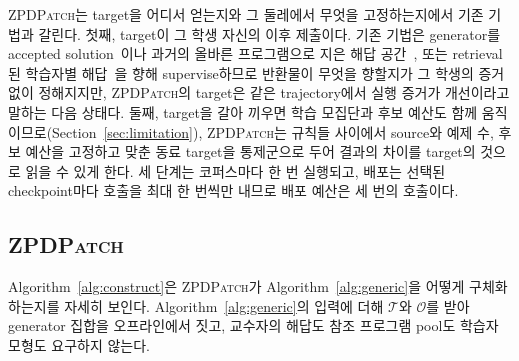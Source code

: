 \documentclass[10pt,conference]{IEEEtran}
\begin{document}
\textsc{ZPDPatch}는 target을 어디서 얻는지와 그 둘레에서 무엇을 고정하는지에서 기존 기법과 갈린다. 첫째, target이 그 학생 자신의 이후 제출이다. 기존 기법은 generator를 accepted solution~\cite{gulwani2018automated,wang2018search,hu2019re}이나 과거의 올바른 프로그램으로 지은 해답 공간~\cite{piech2015embeddings,rivers2017data,price2017isnap}, 또는 retrieval된 학습자별 해답~\cite{dai2026learner}을 향해 supervise하므로 반환물이 무엇을 향할지가 그 학생의 증거 없이 정해지지만, \textsc{ZPDPatch}의 target은 같은 trajectory에서 실행 증거가 개선이라고 말하는 다음 상태다. 둘째, target을 갈아 끼우면 학습 모집단과 후보 예산도 함께 움직이므로(Section~\ref{sec:limitation}), \textsc{ZPDPatch}는 규칙들 사이에서 source와 예제 수, 후보 예산을 고정하고 맞춘 동료 target을 통제군으로 두어 결과의 차이를 target의 것으로 읽을 수 있게 한다. 세 단계는 코퍼스마다 한 번 실행되고, 배포는 선택된 checkpoint마다 호출을 최대 한 번씩만 내므로 배포 예산은 세 번의 호출이다.

\subsection{\textup{\textsc{ZPDPatch}}}

Algorithm~\ref{alg:construct}은 \textsc{ZPDPatch}가 Algorithm~\ref{alg:generic}을 어떻게 구체화하는지를 자세히 보인다. Algorithm~\ref{alg:generic}의 입력에 더해 \(\mathcal T\)와 \(\mathcal O\)를 받아 generator 집합을 오프라인에서 짓고, 교수자의 해답도 참조 프로그램 pool도 학습자 모형도 요구하지 않는다.
\end{document}
